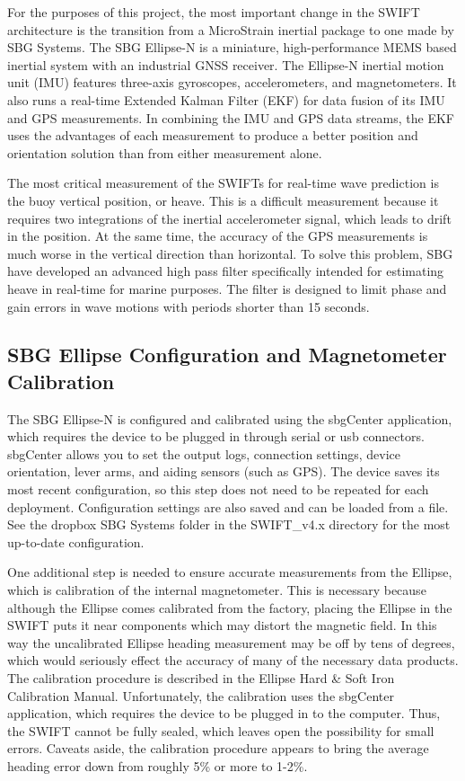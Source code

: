 \documentclass[11pt]{amsart}
\begin{document}
For the purposes of this project, the most important change in the SWIFT architecture is the transition from a MicroStrain inertial package to one made by SBG Systems.  The SBG Ellipse-N is a miniature, high-performance MEMS based inertial system with an industrial GNSS receiver.  The Ellipse-N inertial motion unit (IMU) features three-axis gyroscopes, accelerometers, and magnetometers.  It also runs a real-time Extended Kalman Filter (EKF) for data fusion of its IMU and GPS measurements.  In combining the IMU and GPS data streams, the EKF uses the advantages of each measurement to produce a better position and orientation solution than from either measurement alone.  

The most critical measurement of the SWIFTs for real-time wave prediction is the buoy vertical position, or heave.  This is a difficult measurement because it requires two integrations of the inertial accelerometer signal, which leads to drift in the position.  At the same time, the accuracy of the GPS measurements is much worse in the vertical direction than horizontal.  To solve this problem, SBG have developed an advanced high pass filter specifically intended for estimating heave in real-time for marine purposes.  The filter is designed to limit phase and gain errors in wave motions with periods shorter than 15 seconds.

\subsection{SBG Ellipse Configuration and Magnetometer Calibration}
The SBG Ellipse-N is configured and calibrated using the sbgCenter application, which requires the device to be plugged in through serial or usb connectors.  sbgCenter allows you to set the output logs, connection settings, device orientation, lever arms, and aiding sensors (such as GPS).  The device saves its most recent configuration, so this step does not need to be repeated for each deployment.  Configuration settings are also saved and can be loaded from a file. See the dropbox SBG Systems folder in the SWIFT\_v4.x directory for the most up-to-date configuration.

One additional step is needed to ensure accurate measurements from the Ellipse, which is calibration of the internal magnetometer.  This is necessary because although the Ellipse comes calibrated from the factory, placing the Ellipse in the SWIFT puts it near components which may distort the magnetic field.  In this way the uncalibrated Ellipse heading measurement may be off by tens of degrees, which would seriously effect the accuracy of many of the necessary data products.  The calibration procedure is described in the Ellipse Hard \& Soft Iron Calibration Manual.  Unfortunately, the calibration uses the sbgCenter application, which requires the device to be plugged in to the computer.  Thus, the SWIFT cannot be fully sealed, which leaves open the possibility for small errors.  Caveats aside, the calibration procedure appears to bring the average heading error down from roughly 5\% or more to 1-2\%.
\end{document}
